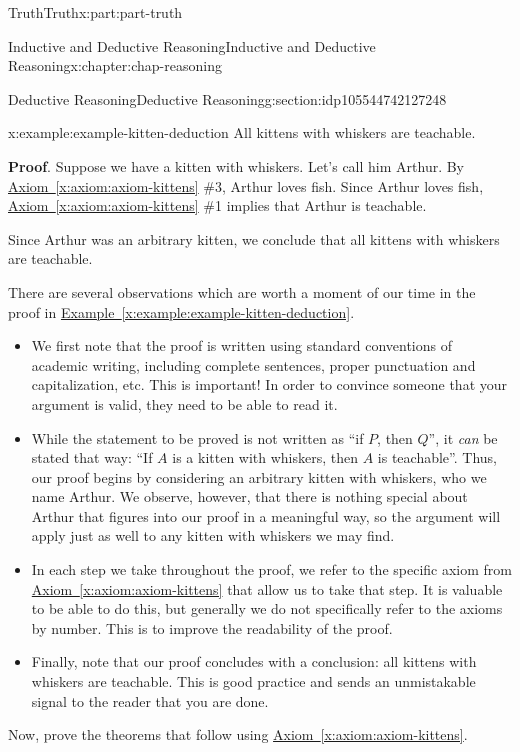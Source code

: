 \documentclass[oneside,10pt,]{book}
\newcommand{\xreffont}{\relax}
\newcommand{\terminology}[1]{\textbf{#1}}
\numberwithin{equation}{section}
\begin{document}
\begin{partptx}{Truth}{}{Truth}{}{}{x:part:part-truth}
\begin{chapterptx}{Inductive and Deductive Reasoning}{}{Inductive and Deductive Reasoning}{}{}{x:chapter:chap-reasoning}
\begin{sectionptx}{Deductive Reasoning}{}{Deductive Reasoning}{}{}{g:section:idp105544742127248}
\begin{example}{}{x:example:example-kitten-deduction}%
All kittens with whiskers are teachable.%
\par
\terminology{Proof}. Suppose we have a kitten with whiskers. Let's call him Arthur. By \hyperref[x:axiom:axiom-kittens]{Axiom~{\xreffont\ref{x:axiom:axiom-kittens}}} \#3, Arthur loves fish. Since Arthur loves fish, \hyperref[x:axiom:axiom-kittens]{Axiom~{\xreffont\ref{x:axiom:axiom-kittens}}} \#1 implies that Arthur is teachable.%
\par
Since Arthur was an arbitrary kitten, we conclude that all kittens with whiskers are teachable.%
\end{example}
There are several observations which are worth a moment of our time in the proof in \hyperref[x:example:example-kitten-deduction]{Example~{\xreffont\ref{x:example:example-kitten-deduction}}}.%
%
\begin{itemize}[label=\textbullet]
\item{}We first note that the proof is written using standard conventions of academic writing, including complete sentences, proper punctuation and capitalization, etc. This is important! In order to convince someone that your argument is valid, they need to be able to read it.%
\item{}While the statement to be proved is not written as ``if \(P\), then \(Q\)'', it \emph{can} be stated that way: ``If \(A\) is a kitten with whiskers, then \(A\) is teachable''. Thus, our proof begins by considering an arbitrary kitten with whiskers, who we name Arthur. We observe, however, that there is nothing special about Arthur that figures into our proof in a meaningful way, so the argument will apply just as well to any kitten with whiskers we may find.%
\item{}In each step we take throughout the proof, we refer to the specific axiom from \hyperref[x:axiom:axiom-kittens]{Axiom~{\xreffont\ref{x:axiom:axiom-kittens}}} that allow us to take that step. It is valuable to be able to do this, but generally we do not specifically refer to the axioms by number. This is to improve the readability of the proof.%
\item{}Finally, note that our proof concludes with a conclusion: all kittens with whiskers are teachable. This is good practice and sends an unmistakable signal to the reader that you are done.%
\end{itemize}
Now, prove the theorems that follow using \hyperref[x:axiom:axiom-kittens]{Axiom~{\xreffont\ref{x:axiom:axiom-kittens}}}.%

\end{sectionptx}
\end{chapterptx}
\end{partptx}
\end{document}
